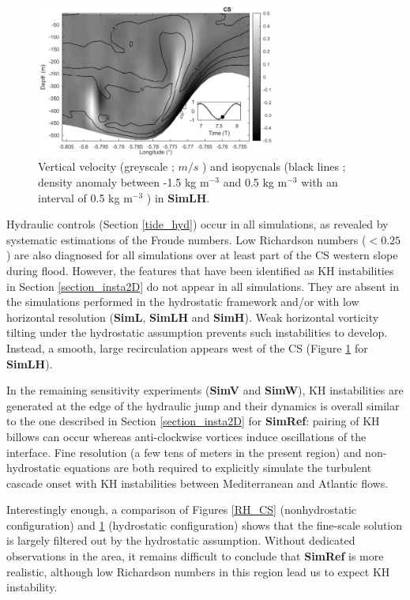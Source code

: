 \begin{figure}[!h]
\centering
  \includegraphics[width=0.7\textwidth]{./GBR2D/figure11.png}
  \caption {Vertical velocity (greyscale ; $m/s$ ) and isopycnals (black lines ; density anomaly between -1.5 kg m$^{-3}$ and 0.5 kg m$^{-3}$ with an interval of 0.5 kg m$^{-3}$ ) in \textbf{SimLH}.}
	\label{fig_sensnum1}
\end{figure}

Hydraulic controls (Section \ref{tide_hyd}) occur in all simulations, as revealed by systematic estimations of the Froude numbers. Low Richardson numbers ($<0.25$) are also diagnosed for all simulations over at least part of the CS western slope during flood. However, the features that have been identified as KH instabilities in Section \ref{section_insta2D} do not appear in all simulations. They are absent in the simulations performed in the hydrostatic framework and/or with low horizontal resolution (\textbf{SimL}, \textbf{SimLH} and \textbf{SimH}). Weak horizontal vorticity tilting under the hydrostatic assumption prevents such instabilities to develop. Instead, a smooth, large recirculation  appears west of the CS (Figure \ref{fig_sensnum1} for \textbf{SimLH}).

In the remaining sensitivity experiments (\textbf{SimV} and \textbf{SimW}), KH instabilities are generated at the edge of the hydraulic jump and their dynamics is overall similar to the one described in Section \ref{section_insta2D} for \textbf{SimRef}: pairing of KH billows can occur whereas anti-clockwise vortices induce oscillations of the interface. 
Fine resolution (a few tens of meters in the present region) and non-hydrostatic equations are both required to explicitly simulate the turbulent cascade onset with KH instabilities between Mediterranean and Atlantic flows. 

Interestingly enough, a comparison of Figures \ref{RH_CS} (nonhydrostatic configuration) and \ref{fig_sensnum1} (hydrostatic configuration) shows that the fine-scale solution is largely filtered out by the hydrostatic assumption. Without dedicated observations in the area, it remains difficult to conclude that \textbf{SimRef} is more realistic, although low Richardson numbers in this region lead us to expect KH instability.

